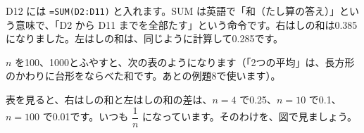 D12 には \texttt{=SUM(D2:D11)} と入れます。SUM は英語で「和（たし算の答え）」という意味で、「D2 から D11 までを全部たす」という命令です。右はしの和は0.385になりました。左はしの和は、同じように計算して0.285です。

$n$ を100、1000とふやすと、次の表のようになります（「2つの平均」は、長方形のかわりに台形をならべた和です。あとの例題8で使います）。

\begin{bkcenter}
\end{bkcenter}

\par
表を見ると、右はしの和と左はしの和の差は、$n=4$ で0.25、$n=10$ で0.1、$n=100$ で0.01です。いつも $\dfrac{1}{n}$ になっています。そのわけを、図で見ましょう。


